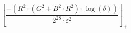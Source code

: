 \[\left\lfloor \frac{-\left(R^{2} \cdot \left(G^{2} + B^{2} \cdot R^{2}\right) \cdot \log\left(\delta\right)\right)}{2^{28} \cdot \varepsilon^{2}} \right\rfloor_{+}\]
